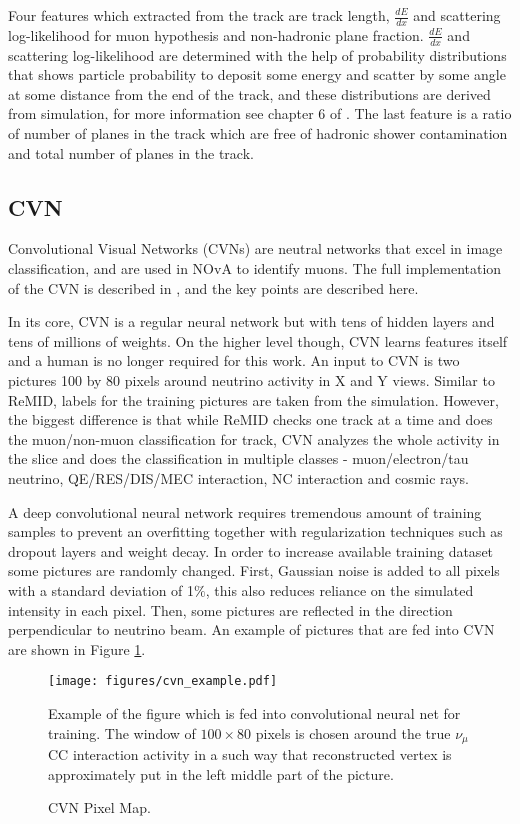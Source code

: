 Four features which extracted from the track are track length, $\frac{dE}{dx}$ and scattering 
log-likelihood for muon hypothesis and non-hadronic plane fraction. $\frac{dE}{dx}$ and scattering log-likelihood 
are determined with the help of probability distributions that shows particle probability to deposit some energy 
and scatter by some angle at some distance from the end of the track, and these distributions are derived from 
simulation, for more information see chapter 6 of \cite{Nick}. The last feature is a ratio of number of planes in 
the track which are free of hadronic shower contamination and total number of planes in the track. 

\subsection{CVN}
Convolutional Visual Networks (CVNs) are neutral networks that excel in image classification, and are used in
NOvA to identify muons. The full implementation of the CVN is described in \cite{CVN}, and the key points are
described here.

In its core, CVN is a regular neural network but with tens of hidden layers and tens of millions of weights. 
On the higher level though, CVN learns features itself and a human is no longer required for this work.
An input to CVN is two pictures 100 by 80 pixels around neutrino activity in X and Y views. Similar to ReMID, labels 
for the training pictures are taken from the simulation. However, the biggest difference is that while ReMID checks
one track at a time and does the muon/non-muon classification for track, CVN analyzes the whole activity in the 
slice and does the classification in multiple classes - muon/electron/tau neutrino, QE/RES/DIS/MEC interaction, 
NC interaction and cosmic rays.

A deep convolutional neural network requires tremendous amount of training samples to prevent an overfitting together 
with regularization techniques such as dropout layers \cite{dropout} and weight decay. In order to increase available 
training dataset some pictures are randomly changed. First, Gaussian noise is added to all pixels with a standard 
deviation of 1$\%$, this also reduces reliance on the simulated intensity in each pixel. Then, some pictures 
are reflected in the direction perpendicular to neutrino beam. An example of pictures that are fed into CVN are
shown in Figure \ref{fig:cvn_example}.
\begin{figure}[h]
\texttt{[image: figures/cvn\_example.pdf]}\\%
\caption{CVN Pixel Map.}
{Example of the figure which is fed into convolutional neural net for training. The window of $100\times80$ 
pixels is chosen around the true $\nu_\mu$ CC interaction activity in a such way that reconstructed vertex is 
approximately put in the left middle part of the picture.}
\label{fig:cvn_example}
\end{figure}


